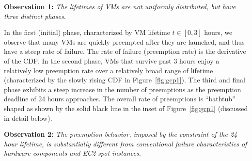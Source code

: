 \noindent \textbf{Observation 1:} \emph{The lifetimes of VMs are not uniformly distributed, but have three distinct phases.}

\noindent In the first (initial) phase, characterized by VM lifetime $t\in [0, 3]$ hours, we observe that many VMs are quickly preempted after they are launched, and thus have a steep rate of failure. The rate of failure (preemption rate) is the derivative of the CDF.
In the second phase, VMs that survive past 3 hours enjoy a relatively low preemption rate over a relatively broad range of lifetime (characterized by the slowly rising CDF in Figure~\ref{fig:gcp1}).
The third and final phase exhibits a steep increase in the number of preemptions as the preemption deadline of 24 hours approaches.
The overall rate of preemptions is ``bathtub'' shaped as shown by the solid black line in the inset of Figure~\ref{fig:gcp1} (discussed in detail below).



\noindent \textbf{Observation 2:} \emph{The preemption behavior, imposed by the constraint of the 24 hour lifetime, is substantially different from conventional failure characteristics of hardware components and EC2 spot instances.}

